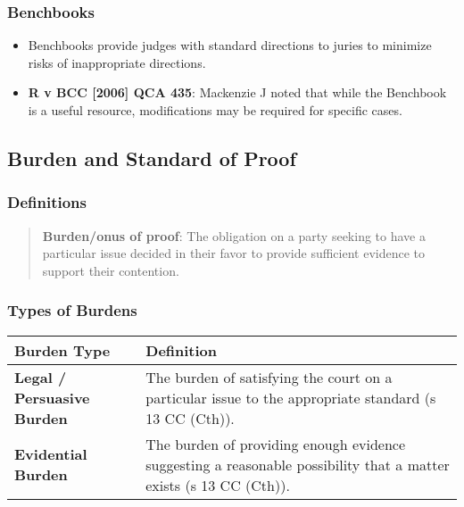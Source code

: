 \subsubsection{Benchbooks}\label{benchbooks}

\begin{itemize}
\tightlist
\item
  Benchbooks provide judges with standard directions to juries to
  minimize risks of inappropriate directions.
\item
  \textbf{R v BCC {[}2006{]} QCA 435}: Mackenzie J noted that while the
  Benchbook is a useful resource, modifications may be required for
  specific cases.
\end{itemize}

\subsection{Burden and Standard of
Proof}\label{burden-and-standard-of-proof}

\subsubsection{Definitions}\label{definitions}

\begin{quote}
\textbf{Burden/onus of proof}: The obligation on a party seeking to have
a particular issue decided in their favor to provide sufficient evidence
to support their contention.
\end{quote}

\subsubsection{Types of Burdens}\label{types-of-burdens}

\begin{longtable}[]{@{}
  >{\raggedright\arraybackslash}p{}
  >{\raggedright\arraybackslash}p{}@{}}
\toprule\noalign{}
\begin{minipage}[b]{\linewidth}\raggedright
Burden Type
\end{minipage} & \begin{minipage}[b]{\linewidth}\raggedright
Definition
\end{minipage} \\
\midrule\noalign{}
\endhead
\bottomrule\noalign{}
\endlastfoot
\textbf{Legal / Persuasive Burden} & The burden of satisfying the court
on a particular issue to the appropriate standard (s 13 CC (Cth)). \\
\textbf{Evidential Burden} & The burden of providing enough evidence
suggesting a reasonable possibility that a matter exists (s 13 CC
(Cth)). \\
\end{longtable}

